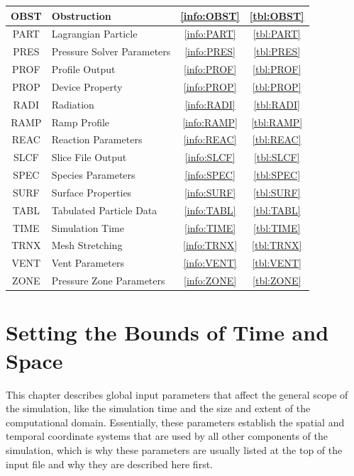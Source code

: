 \documentclass[11pt]{book}
\begin{document}
\begin{table}[ht]
\begin{center}
\begin{tabular}{|c|l|c|c|}
{\ct OBST}  & Obstruction                  & \ref{info:OBST} & \ref{tbl:OBST}  \\ \hline
{\ct PART}  & Lagrangian Particle          & \ref{info:PART} & \ref{tbl:PART}  \\ \hline
{\ct PRES}  & Pressure Solver Parameters   & \ref{info:PRES} & \ref{tbl:PRES}  \\ \hline
{\ct PROF}  & Profile Output               & \ref{info:PROF} & \ref{tbl:PROF}  \\ \hline
{\ct PROP}  & Device Property              & \ref{info:PROP} & \ref{tbl:PROP}  \\ \hline
{\ct RADI}  & Radiation                    & \ref{info:RADI} & \ref{tbl:RADI}  \\ \hline
{\ct RAMP}  & Ramp Profile                 & \ref{info:RAMP} & \ref{tbl:RAMP}  \\ \hline
{\ct REAC}  & Reaction Parameters          & \ref{info:REAC} & \ref{tbl:REAC}  \\ \hline
{\ct SLCF}  & Slice File Output            & \ref{info:SLCF} & \ref{tbl:SLCF}  \\ \hline
{\ct SPEC}  & Species Parameters           & \ref{info:SPEC} & \ref{tbl:SPEC}  \\ \hline
{\ct SURF}  & Surface Properties           & \ref{info:SURF} & \ref{tbl:SURF}  \\ \hline
{\ct TABL}  & Tabulated Particle Data      & \ref{info:TABL} & \ref{tbl:TABL}  \\ \hline
{\ct TIME}  & Simulation Time              & \ref{info:TIME} & \ref{tbl:TIME}  \\ \hline
{\ct TRNX}  & Mesh Stretching              & \ref{info:TRNX} & \ref{tbl:TRNX}  \\ \hline
{\ct VENT}  & Vent Parameters              & \ref{info:VENT} & \ref{tbl:VENT}  \\ \hline
{\ct ZONE}  & Pressure Zone Parameters     & \ref{info:ZONE} & \ref{tbl:ZONE}  \\ \hline
\end{tabular}
\end{center}
\end{table}


\clearpage

\chapter{Setting the Bounds of Time and Space}

This chapter describes global input parameters that affect the general scope of the simulation, like
the simulation time and the size and extent of the computational domain. Essentially, these parameters
establish the spatial and temporal coordinate systems that are used by all other components of the simulation, which is
why these parameters are usually listed at the top of the input file and why they are described here first.
\end{document}
